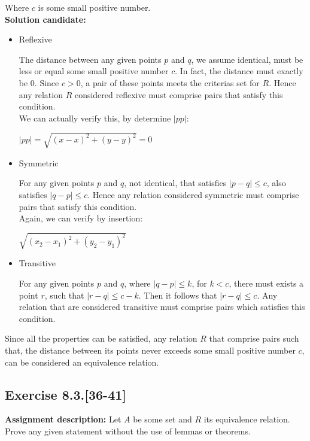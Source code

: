 \documentclass{report}
\newcommand{\cent}[1]{\begin{center}#1\end{center}}
\newcommand{\AssignmentDescription}{\textbf{Assignment description: }}
\newcommand{\Solution}{\textbf{Solution candidate: }}
\newcommand{\QED}{\boxed{}}
\newcommand{\Exercise}[1]{\subsection{Exercise #1}}
\begin{document}
	Where $c$ is some small positive number.\\
	
	\Solution
	
	\begin{itemize}
		\item Reflexive
		
		The distance between any given points $p$ and $q$, we assume identical, must be less or equal some small positive number $c$. In fact, the distance must exactly be 0. Since $c > 0$, a pair of these points meets the criterias set for $R$. Hence any relation $R$ considered reflexive must comprise pairs that satisfy this condition.\\
		
		We can actually verify this, by determine $|pp|$:
		
		\cent{$ |pp| = \sqrt{(x - x)^2 + (y - y)^2} = 0 $}
		
		\item Symmetric
		
		For any given points $p$ and $q$, not identical, that satisfies $|p-q| \leq c$, also satisfies $|q-p| \leq c$. Hence any relation considered symmetric must comprise pairs that satisfy this condition.\\
		
		Again, we can verify by insertion:
		
		\cent{$\sqrt{(x_2 - x_1)^2 + (y_2 - y_1)^2}$}
		
		\item Transitive
		
		For any given points $p$ and $q$, where $|q-p| \leq k$, for $k < c$, there must exists a point $r$, such that $|r-q| \leq c - k$. Then it follows that $|r-q| \leq c$. Any relation that are considered transitive must comprise pairs which satisfies this condition.\\
	\end{itemize}
	
	Since all the properties can be satisfied, any relation $R$ that comprise pairs such that, the distance between its points never exceeds some small positive number $c$, can be considered an equivalence relation.\\
	\QED
	
	\Exercise{8.3.[36-41]}
	
	\AssignmentDescription
	Let $A$ be some set and $R$ its equivalence relation.\\
	
	Prove any given statement without the use of lemmas or theorems.\\
	
\end{document}
